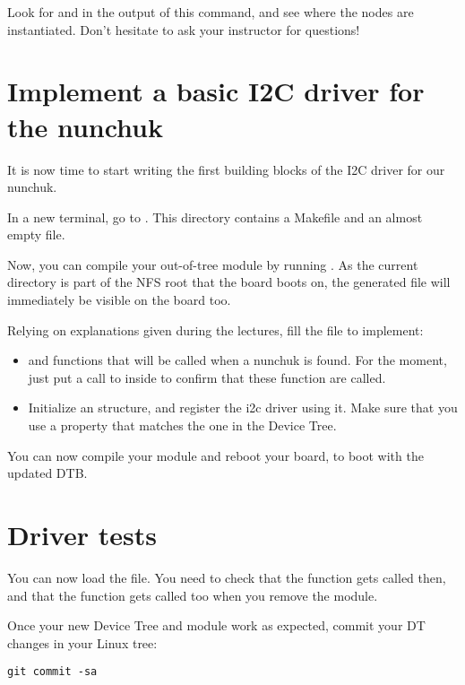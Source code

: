 Look for  and  in the output of this command,
and see where the nodes are instantiated. Don't hesitate to ask your
instructor for questions!

\section{Implement a basic I2C driver for the nunchuk}

It is now time to start writing the first building blocks of the I2C
driver for our nunchuk.

In a new terminal, go to
.  This directory
contains a Makefile and an almost empty  file.

Now, you can compile your out-of-tree module by running . As
the current directory is part of the NFS root that the board boots on,
the generated  file will immediately be visible on the board
too.

Relying on explanations given during the lectures, fill the
 file to implement:

\begin{itemize}
\item {} and  functions that will
      be called when a nunchuk is found.
      For the moment, just put a call to  inside
      to confirm that these function are called.
\item Initialize an  structure, and register
      the i2c driver using it. Make sure that you use
      a  property that matches the one in the
      Device Tree.
\end{itemize}

You can now compile your module and reboot your board, to
boot with the updated DTB.

\section{Driver tests}

You can now load the  file.
You need to check that the  function gets called
then, and that the  function gets called too
when you remove the module.

Once your new Device Tree and module work as expected, commit
your DT changes in your Linux tree:

\begin{verbatim}
git commit -sa
\end{verbatim}

